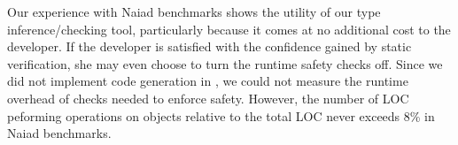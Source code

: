 Our experience with Naiad benchmarks shows the utility of our
type inference/checking tool,
particularly because it comes at no additional cost to the developer.
If the developer is satisfied with
the confidence gained by static verification, she may even choose to
turn the runtime safety checks off. Since we did not implement code
generation in \namec, we could not measure the runtime overhead of
checks needed to enforce safety. However, the number of LOC peforming
operations on  objects relative to the total LOC never
exceeds 8\% in Naiad benchmarks. 


